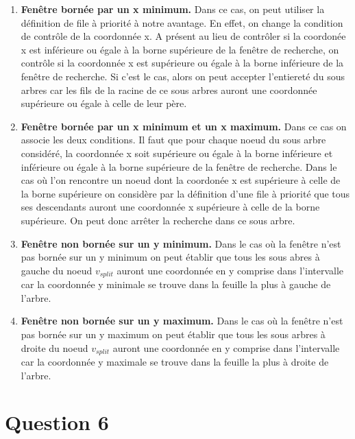 \documentclass{article}
\begin{document}
    \begin{enumerate}
        \item \textbf{Fenêtre bornée par un x minimum.} Dans ce cas, on peut utiliser la définition de file à priorité à notre avantage. En effet, on change la condition de contrôle de la coordonnée x.
        A présent au lieu de contrôler si la coordonée x est inférieure ou égale à la borne supérieure de la fenêtre de recherche, on contrôle si la coordonnée x est supérieure ou égale à la borne inférieure de la fenêtre de recherche.
        Si c'est le cas, alors on peut accepter l'entiereté du sous arbres car les fils de la racine de ce sous arbres auront une coordonnée supérieure ou égale à celle de leur père.
        \item \textbf{Fenêtre bornée par un x minimum et un x maximum.} Dans ce cas on associe les deux conditions. Il faut que pour chaque noeud du sous arbre considéré, la coordonnée x soit supérieure ou égale à la borne inférieure et
        inférieure ou égale à la borne supérieure de la fenêtre de recherche. Dans le cas où l'on rencontre un noeud dont la coordonée x est supérieure à celle de la borne supérieure on considère par la définition
        d'une file à priorité que tous ses descendants auront une coordonnée x supérieure à celle de la borne supérieure. On peut donc arrêter la recherche dans ce sous arbre.
        \item \textbf{Fenêtre non bornée sur un y minimum.} Dans le cas où la fenêtre n'est pas bornée sur un y minimum on peut établir que tous les sous abres à gauche du noeud 
        $v_{split}$ auront une coordonnée en y comprise dans l'intervalle car la coordonnée y minimale se trouve dans la feuille la plus à gauche de l'arbre.
        \item \textbf{Fenêtre non bornée sur un y maximum.} Dans le cas où la fenêtre n'est pas bornée sur un y maximum on peut établir que tous les sous arbres à droite du noeud
        $v_{split}$ auront une coordonnée en y comprise dans l'intervalle car la coordonnée y maximale se trouve dans la feuille la plus à droite de l'arbre.
    \end{enumerate}
\newpage
\section{Question 6}
\end{document}
